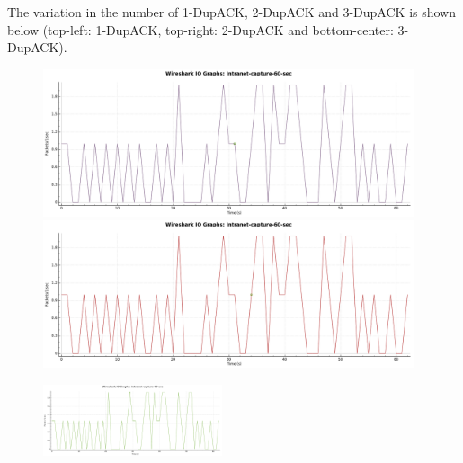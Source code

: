 \documentclass{article}
\begin{document}
\begin{flushleft}
The variation in the number of 1-DupACK, 2-DupACK and 3-DupACK is shown below (top-left: 1-DupACK, top-right: 2-DupACK and bottom-center: 3-DupACK).
\begin{figure}[H]
\begin{minipage}{0.48\linewidth}
\centering
\includegraphics[width=0.975\textwidth]{1-dup-ack-Intranet.png}
\end{minipage}
\hfill
\begin{minipage}{0.48\linewidth}
\centering
\includegraphics[width=0.975\textwidth]{2-dup-ack-Intranet.png}
\end{minipage}
\end{figure}
\begin{figure}[H]
\centering
\includegraphics[width=0.47\textwidth]{3-dup-ack-Intranet.png}
\end{figure}
\end{flushleft}
\end{document}
